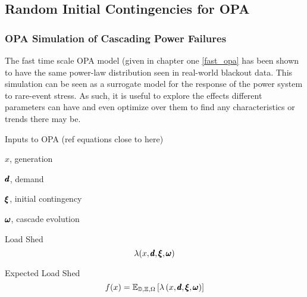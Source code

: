 \subsection{Random Initial Contingencies for OPA}

\subsubsection{OPA Simulation of Cascading Power Failures}
The fast time scale OPA model (given in chapter one \ref{fast_opa} has been shown to have the same power-law distribution seen in real-world blackout data.  This simulation can be seen as a surrogate model for the response of the power system to rare-event stress.  As such, it is useful to explore the effects different parameters can have and even optimize over them to find any characteristics or trends there may be.

Inputs to OPA (ref equations close to here)
\bi
\item $x$, generation
\item $\pmb{d}$, demand
\item $\pmb{\xi}$, initial contingency
\item $\pmb{\omega}$, cascade evolution
\ei

Load Shed
\begin{equation}
\lambda ( x, \pmb{d}, \pmb{\xi}, \pmb{\omega} )
\end{equation}

Expected Load Shed
\begin{equation*}
f(x) = \mathbb{E}_{\mathbb{D}, \Xi,\Omega} \left[  \lambda\left(x,\pmb{d},\pmb{\xi},\pmb{\omega}\right)  \right]
\end{equation*}


